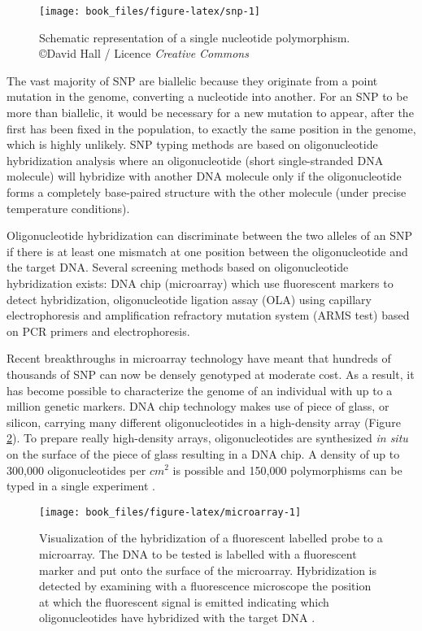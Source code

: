 \documentclass[]{book}
\begin{document}
\begin{figure}

{\centering \texttt{[image: book\_files/figure-latex/snp-1]} 

}

\caption{Schematic representation of a single nucleotide polymorphism. \copyright David Hall / Licence \textit{Creative Commons}}\label{fig:snp}
\end{figure}

The vast majority of SNP are biallelic because they originate from a
point mutation in the genome, converting a nucleotide into another. For
an SNP to be more than biallelic, it would be necessary for a new
mutation to appear, after the first has been fixed in the population, to
exactly the same position in the genome, which is highly unlikely. SNP
typing methods are based on oligonucleotide hybridization analysis where
an oligonucleotide (short single-stranded DNA molecule) will hybridize
with another DNA molecule only if the oligonucleotide forms a completely
base-paired structure with the other molecule (under precise temperature
conditions).

Oligonucleotide hybridization can discriminate between the two alleles
of an SNP if there is at least one mismatch at one position between the
oligonucleotide and the target DNA. Several screening methods based on
oligonucleotide hybridization exists: DNA chip (microarray) which use
fluorescent markers to detect hybridization, oligonucleotide ligation
assay (OLA) using capillary electrophoresis and amplification refractory
mutation system (ARMS test) based on PCR primers and electrophoresis.

Recent breakthroughs in microarray technology have meant that hundreds
of thousands of SNP can now be densely genotyped at moderate cost. As a
result, it has become possible to characterize the genome of an
individual with up to a million genetic markers. DNA chip technology
makes use of piece of glass, or silicon, carrying many different
oligonucleotides in a high-density array (Figure \ref{fig:microarray}). To
prepare really high-density arrays, oligonucleotides are synthesized \emph{in
situ} on the surface of the piece of glass resulting in a DNA chip. A
density of up to 300,000 oligonucleotides per \(cm^2\) is possible and
150,000 polymorphisms can be typed in a single experiment
\citep{brown2007genomes}.



\begin{figure}

{\centering \texttt{[image: book\_files/figure-latex/microarray-1]} 

}

\caption{Visualization of the hybridization of a fluorescent labelled probe to a microarray. The DNA to be tested is labelled with a fluorescent marker and put onto the surface of the microarray. Hybridization is detected by examining with a fluorescence microscope the position at which the fluorescent signal is emitted indicating which oligonucleotides have hybridized with the target DNA \citep{brown2007genomes}.}\label{fig:microarray}
\end{figure}
\end{document}
